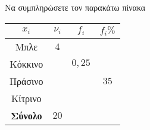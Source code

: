Να συμπληρώσετε τον παρακάτω πίνακα\\
\begin{center}
\begin{tabular}{|c|c|c|c|}
\hline $ x_i $ & $ \nu_i $ & $ f_i $ & $ f_i\% $ \\
\hline Μπλε & $ 4 $ &  &  \\
\hline Κόκκινο &  & $ 0{,}25 $ &  \\
\hline Πράσινο &  &  & $ 35 $ \\
\hline Κίτρινο &  &  &  \\
\hline \textbf{Σύνολο} & $ 20 $ &  & \\
\hline
\end{tabular}
\end{center}
